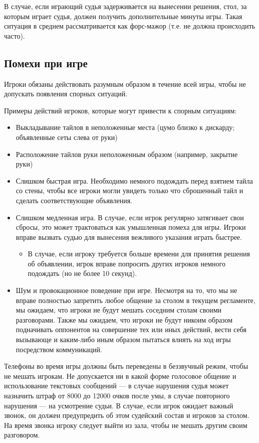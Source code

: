 В случае, если играющий судья задерживается на вынесении решения, стол, за которым играет судья, должен получить дополнительные минуты игры. Такая ситуация в среднем рассматривается как форс-мажор (т.е. не должна происходить часто).

\subsection{Помехи при игре}

Игроки обязаны действовать разумным образом в течение всей игры, чтобы не допускать появления спорных ситуаций.

Примеры действий игроков, которые могут привести к спорным ситуациям:
\begin{itemize}
	\item Выкладывание тайлов в неположенные места (цумо близко к дискарду; объявленные сеты слева от руки)
	\item Расположение тайлов руки неположенным образом (например, закрытие руки)
	\item Слишком быстрая игра. Необходимо немного подождать перед взятием тайла со стены, чтобы все игроки могли увидеть только что сброшенный тайл и сделать соответствующие объявления.
	\item Слишком медленная игра. В случае, если игрок регулярно затягивает свои сбросы, это может трактоваться как умышленная помеха для игры. Игроки вправе вызвать судью для вынесения вежливого указания играть быстрее.
	\begin{itemize}
		\item В случае, если игроку требуется больше времени для принятия решения об объявлении, игрок вправе попросить других игроков немного подождать (но не более 10 секунд).
	\end{itemize}
	\item Шум и провокационное поведение при игре. Несмотря на то, что мы не вправе полностью запретить любое общение за столом в текущем регламенте, мы ожидаем, что игроки не будут мешать соседним столам своими разговорами. Также мы ожидаем, что игроки не будут никоим образом подначивать оппонентов на совершение тех или иных действий, вести себя вызывающе и каким-либо иным образом пытаться влиять на ход игры посредством коммуникаций.
\end{itemize}

Телефоны во время игры должны быть переведены в беззвучный режим, чтобы не мешать игрокам. Не допускается ни в какой форме голосовое общение и использование текстовых сообщений --- в случае нарушения судья может назначить штраф от 8000 до 12000 очков после умы, в случае повторного нарушения --- на усмотрение судьи. В случае, если игрок ожидает важный звонок, он должен предупредить об этом судейский состав и игроков за столом. На время звонка игроку следует выйти из зала, чтобы не мешать другим своим разговором.

